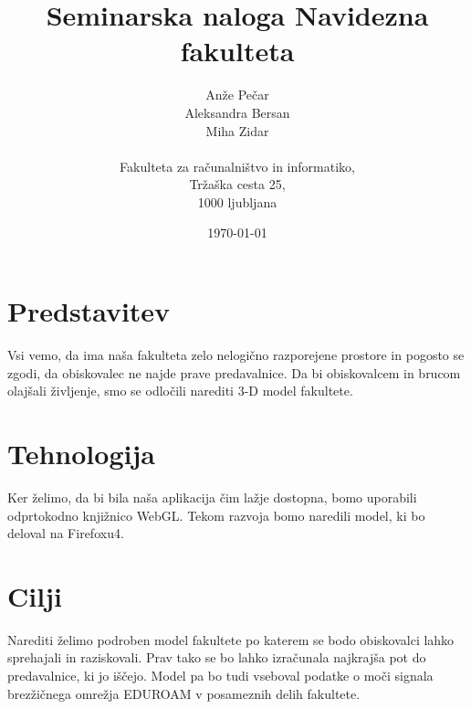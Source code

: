 \documentclass{article}
\begin{document}
\title{Seminarska naloga Navidezna fakulteta}
\author{Anže Pečar\\
        Aleksandra Bersan\\
        Miha Zidar\\\\
	    Fakulteta za računalništvo in informatiko,\\
		Tržaška cesta 25,\\
		1000 ljubljana\\}		
\date{\today}
\maketitle
\pagebreak
\section{Predstavitev}
Vsi vemo, da ima naša fakulteta zelo nelogično razporejene prostore in pogosto se zgodi, da obiskovalec ne najde prave predavalnice. Da bi obiskovalcem in brucom olajšali življenje,
smo se odločili narediti 3-D model fakultete.
\section{Tehnologija}
Ker želimo, da bi bila naša aplikacija čim lažje dostopna, bomo uporabili odprtokodno knjižnico WebGL. Tekom razvoja bomo naredili model, ki bo deloval na Firefoxu4.
\section{Cilji}
Narediti želimo podroben model fakultete po katerem se bodo obiskovalci lahko sprehajali in raziskovali. Prav tako se bo lahko izračunala najkrajša pot do 
predavalnice, ki jo iščejo. Model pa bo tudi vseboval podatke o moči signala brezžičnega omrežja EDUROAM v posameznih delih fakultete. 
\end{document}
